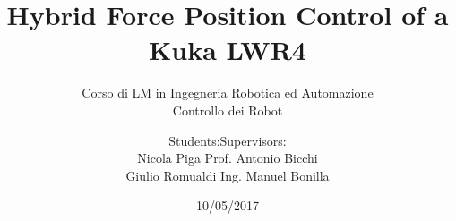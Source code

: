 \documentclass{beamer}
\date{10/05/2017}
\title[]{Hybrid Force Position Control of a Kuka LWR4}
\subtitle{Corso di LM in Ingegneria Robotica ed Automazione \\
  Controllo dei Robot}
\author{Students:\hfill Supervisors:\\
Nicola Piga \hfill Prof. Antonio Bicchi\\
Giulio Romualdi \hfill Ing. Manuel Bonilla}
\institute[]{Università di Pisa}
\begin{document}

\begin{frame}
  \maketitle
\end{frame}











\end{document}
